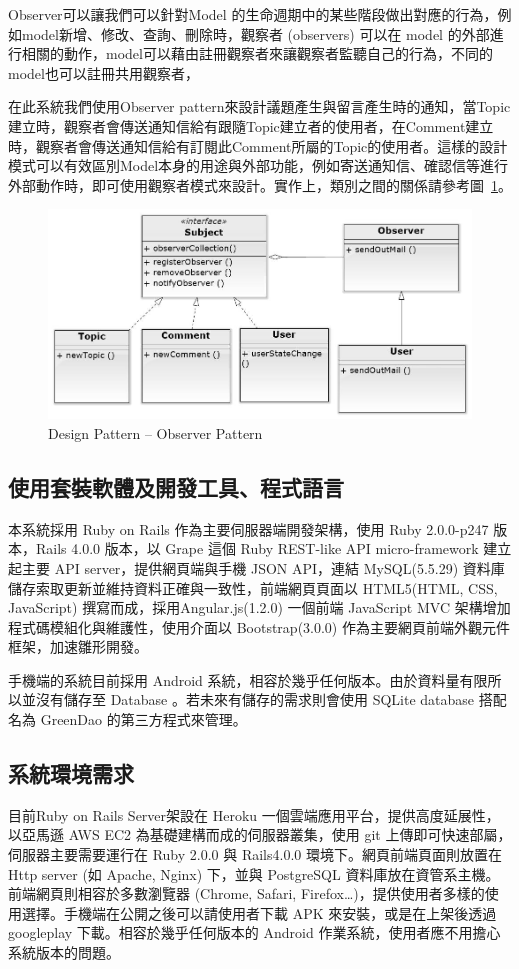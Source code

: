 \documentclass[11pt]{article}
\begin{document}
Observer可以讓我們可以針對Model 的生命週期中的某些階段做出對應的行為，例如model新增、修改、查詢、刪除時，觀察者 (observers) 可以在 model 的外部進行相關的動作，model可以藉由註冊觀察者來讓觀察者監聽自己的行為，不同的model也可以註冊共用觀察者，

在此系統我們使用Observer pattern來設計議題產生與留言產生時的通知，當Topic建立時，觀察者會傳送通知信給有跟隨Topic建立者的使用者，在Comment建立時，觀察者會傳送通知信給有訂閱此Comment所屬的Topic的使用者。這樣的設計模式可以有效區別Model本身的用途與外部功能，例如寄送通知信、確認信等進行外部動作時，即可使用觀察者模式來設計。實作上，類別之間的關係請參考圖~\ref{pic:dp:obs}。

\begin{figure}[H]
\centering
\includegraphics[width=\textwidth]{img/dp/observer.jpg}
\caption{Design Pattern -- Observer Pattern}
\label{pic:dp:obs}
\end{figure}

\subsection{使用套裝軟體及開發工具、程式語言}
本系統採用 Ruby on Rails 作為主要伺服器端開發架構，使用 Ruby 2.0.0-p247 版本，Rails 4.0.0 版本，以 Grape 這個 Ruby REST-like API micro-framework 建立起主要 API server，提供網頁端與手機 JSON API，連結 MySQL(5.5.29) 資料庫儲存索取更新並維持資料正確與一致性，前端網頁頁面以 HTML5(HTML, CSS, JavaScript) 撰寫而成，採用Angular.js(1.2.0) 一個前端 JavaScript MVC 架構增加程式碼模組化與維護性，使用介面以 Bootstrap(3.0.0) 作為主要網頁前端外觀元件框架，加速雛形開發。

手機端的系統目前採用 Android 系統，相容於幾乎任何版本。由於資料量有限所以並沒有儲存至 Database 。若未來有儲存的需求則會使用 SQLite database 搭配名為 GreenDao 的第三方程式來管理。
\subsection{系統環境需求}
目前Ruby on Rails Server架設在 Heroku 一個雲端應用平台，提供高度延展性，以亞馬遜 AWS EC2 為基礎建構而成的伺服器叢集，使用 git 上傳即可快速部屬，伺服器主要需要運行在 Ruby 2.0.0 與 Rails4.0.0 環境下。網頁前端頁面則放置在 Http server (如 Apache, Nginx) 下，並與 PostgreSQL 資料庫放在資管系主機。前端網頁則相容於多數瀏覽器 (Chrome, Safari, Firefox…)，提供使用者多樣的使用選擇。手機端在公開之後可以請使用者下載 APK 來安裝，或是在上架後透過 googleplay 下載。相容於幾乎任何版本的 Android 作業系統，使用者應不用擔心系統版本的問題。


\end{document}
